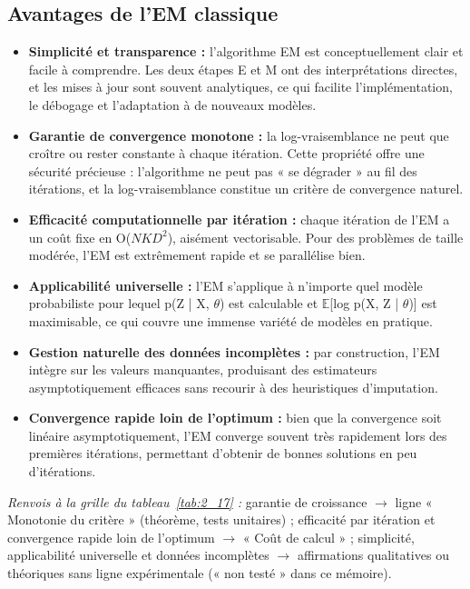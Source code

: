 \subsection{Avantages de l'EM classique}
\begin{itemize}
\item \textbf{Simplicité et transparence : }l'algorithme EM est conceptuellement clair et facile à comprendre. Les deux étapes E et M ont des interprétations directes, et les mises à jour sont souvent analytiques, ce qui facilite l'implémentation, le débogage et l'adaptation à de nouveaux modèles.
\item \textbf{Garantie de convergence monotone : }la log-vraisemblance ne peut que croître ou rester constante à chaque itération. Cette propriété offre une sécurité précieuse : l'algorithme ne peut pas « se dégrader » au fil des itérations, et la log-vraisemblance constitue un critère de convergence naturel.
\item \textbf{Efficacité computationnelle par itération : }chaque itération de l'EM a un coût fixe en O($NKD^{2}$), aisément vectorisable. Pour des problèmes de taille modérée, l'EM est extrêmement rapide et se parallélise bien.
\item \textbf{Applicabilité universelle : }l'EM s'applique à n'importe quel modèle probabiliste pour lequel p(Z | X, $\theta $) est calculable et $\mathbb{E}$[log p(X, Z | $\theta $)] est maximisable, ce qui couvre une immense variété de modèles en pratique.
\item \textbf{Gestion naturelle des données incomplètes : }par construction, l'EM intègre sur les valeurs manquantes, produisant des estimateurs asymptotiquement efficaces sans recourir à des heuristiques d'imputation.
\item \textbf{Convergence rapide loin de l'optimum : }bien que la convergence soit linéaire asymptotiquement, l'EM converge souvent très rapidement lors des premières itérations, permettant d'obtenir de bonnes solutions en peu d'itérations.
\end{itemize}
\par\noindent\emph{Renvois à la grille du tableau~\ref{tab:2_17} :} garantie de croissance $\to$ ligne « Monotonie du critère » (théorème, tests unitaires) ; efficacité par itération et convergence rapide loin de l'optimum $\to$ « Coût de calcul » ; simplicité, applicabilité universelle et données incomplètes $\to$ affirmations qualitatives ou théoriques sans ligne expérimentale (« non testé » dans ce mémoire).
